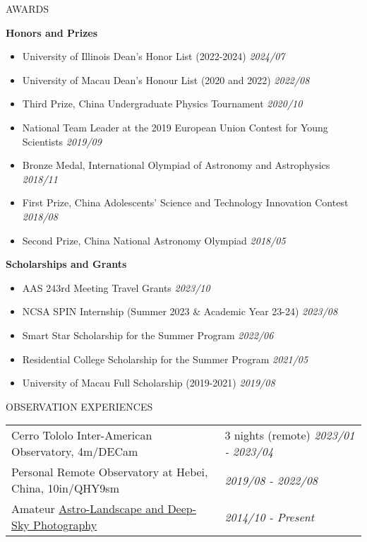 \documentclass[11pt]{article} %
\begin{document}
\begin{section}{AWARDS}

\textbf{Honors and Prizes}

\begin{itemize}[leftmargin=1.5em]
    \item University of Illinois Dean's Honor List (2022-2024) \hfill \textit{2024/07}
    \item University of Macau Dean's Honour List (2020 and 2022) \hfill \textit{2022/08}
    \item Third Prize, China Undergraduate Physics Tournament \hfill \textit{2020/10}
    \item National Team Leader at the 2019 European Union Contest for Young Scientists \hfill \textit{2019/09}
    \item Bronze Medal, International Olympiad of Astronomy and Astrophysics \hfill \textit{2018/11}
    \item First Prize, China Adolescents' Science and Technology Innovation Contest \hfill \textit{2018/08}
    \item Second Prize, China National Astronomy Olympiad \hfill \textit{2018/05}
\end{itemize}
        
\textbf{Scholarships and Grants}

\begin{itemize}[leftmargin=1.5em]
    \item AAS 243rd Meeting Travel Grants \hfill \textit{2023/10}
    \item NCSA SPIN Internship (Summer 2023 \& Academic Year 23-24) \hfill \textit{2023/08}
    \item Smart Star Scholarship for the Summer Program \hfill \textit{2022/06}
    \item Residential College Scholarship for the Summer Program \hfill \textit{2021/05}
    \item University of Macau Full Scholarship (2019-2021) \hfill \textit{2019/08}
\end{itemize}
        
\end{section}

\begin{section}{OBSERVATION EXPERIENCES}

\begin{tabular}{@{}p{0.6\linewidth}@{}p{0.4\linewidth}@{}}
    Cerro Tololo Inter-American Observatory, 4m/DECam & 3 nights (remote) \hfill \textit{2023/01 - 2023/04} \\
    Personal Remote Observatory at Hebei, China, 10in/QHY9sm & \hfill \textit{2019/08 - 2022/08} \\
    Amateur \href{https://yliu.fit/astrophotography/}{Astro-Landscape and Deep-Sky Photography} & \hfill \textit{2014/10 - Present}
\end{tabular}

\end{section}
\end{document}

